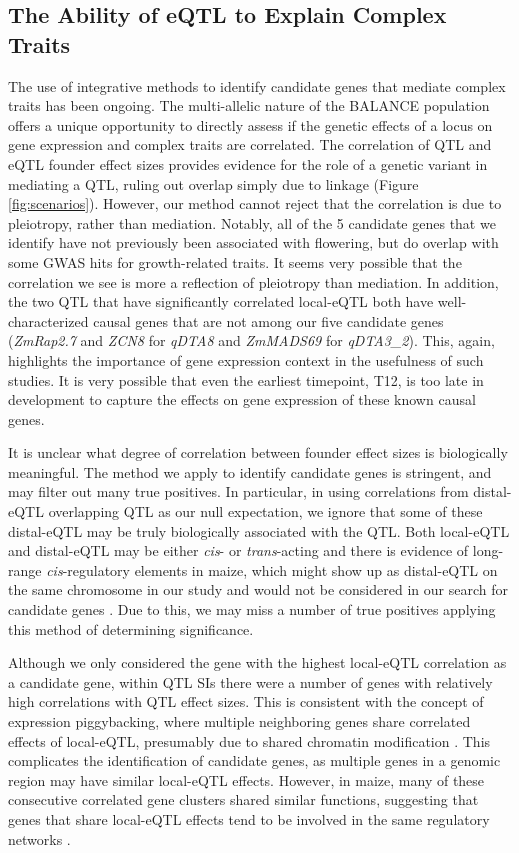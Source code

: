 \documentclass[article,9pt,twocolumn,twoside]{rilabRxiv}
\begin{document}
\subsection{The Ability of eQTL to Explain Complex Traits}
The use of integrative methods to identify candidate genes that mediate complex traits has been ongoing.
The multi-allelic nature of the BALANCE population offers a unique opportunity to directly assess if the genetic effects of a locus on gene expression and complex traits are correlated.
The correlation of QTL and eQTL founder effect sizes provides evidence for the role of a genetic variant in mediating a QTL, ruling out overlap simply due to linkage (Figure \ref{fig:scenarios}).
However, our method cannot reject that the correlation is due to pleiotropy, rather than mediation.
Notably, all of the 5 candidate genes that we identify have not previously been associated with flowering, but do overlap with some GWAS hits for growth-related traits.
It seems very possible that the correlation we see is more a reflection of pleiotropy than mediation.
In addition, the two QTL that have significantly correlated local-eQTL both have well-characterized causal genes that are not among our five candidate genes (\textit{ZmRap2.7} and \textit{ZCN8} for \textit{qDTA8} and \textit{ZmMADS69} for \textit{qDTA3\_2}).
This, again, highlights the importance of gene expression context in the usefulness of such studies.
It is very possible that even the earliest timepoint, T12, is too late in development to capture the effects on gene expression of these known causal genes.
\par
It is unclear what degree of correlation between founder effect sizes is biologically meaningful.
The method we apply to identify candidate genes is stringent, and may filter out many true positives.
In particular, in using correlations from distal-eQTL overlapping QTL as our null expectation, we ignore that some of these distal-eQTL may be truly biologically associated with the QTL.
Both local-eQTL and distal-eQTL may be either \textit{cis}- or \textit{trans}-acting and there is evidence of long-range \textit{cis}-regulatory elements in maize, which might show up as distal-eQTL on the same chromosome in our study and would not be considered in our search for candidate genes \citep{Ricci}.
Due to this, we may miss a number of true positives applying this method of determining significance.
\par
Although we only considered the gene with the highest local-eQTL correlation as a candidate gene, within QTL SIs there were a number of genes with relatively high correlations with QTL effect sizes.
This is consistent with the concept of expression piggybacking, where multiple neighboring genes share correlated effects of local-eQTL, presumably due to shared chromatin modification \citep{Ghanbarian,Wang3}.
This complicates the identification of candidate genes, as multiple genes in a genomic region may have similar local-eQTL effects.
However, in maize, many of these consecutive correlated gene clusters shared similar functions, suggesting that genes that share local-eQTL effects tend to be involved in the same regulatory networks \citep{Wang3}.
\end{document}
